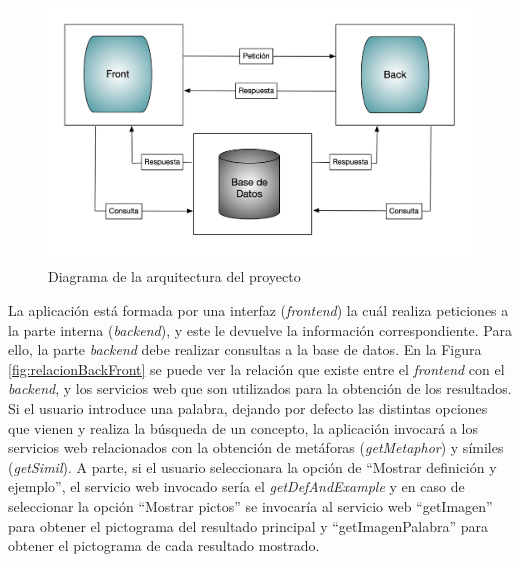 \begin{figure}[!h]
	\includegraphics[width=.9\textwidth]{Imagenes/Bitmap/Capitulo4/DiagramaArquitectura.png}
	\caption{Diagrama de la arquitectura del proyecto}
	\label{fig:diagrama_arquitectura}
\end{figure}

La aplicación está formada por una interfaz (\textit{frontend}) la cuál realiza peticiones a la parte interna (\textit{backend}), y este le devuelve la información correspondiente. Para ello, la parte \textit{backend} debe realizar consultas a la base de datos. En la Figura \ref{fig:relacionBackFront}  se puede ver la relación que existe entre el \textit{frontend} con el \textit{backend}, y los servicios web que son utilizados para la obtención de los resultados.
Si el usuario introduce una palabra, dejando por defecto las distintas opciones que vienen y realiza la búsqueda de un concepto, la aplicación invocará a los servicios web relacionados con la obtención de metáforas (\textit{getMetaphor}) y símiles (\textit{getSimil}). A parte, si el usuario seleccionara la opción de ``Mostrar definición y ejemplo'', el servicio web invocado sería el \textit{getDefAndExample} y en caso de seleccionar la opción  ``Mostrar pictos'' se invocaría al servicio web ``getImagen'' para obtener el pictograma del resultado principal y ``getImagenPalabra'' para obtener el pictograma de cada resultado mostrado.

